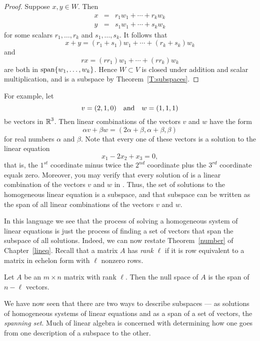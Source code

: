 \documentclass{ximera}
\begin{document}
\begin{proof}  Suppose $x,y\in W$.  Then
\begin{eqnarray*}
x & = & r_1w_1 + \cdots + r_kw_k \\
y & = & s_1w_1 + \cdots + s_kw_k
\end{eqnarray*}
for some scalars $r_1,\ldots,r_k$ and $s_1,\ldots,s_k$.  It
follows that
\[
x+y = (r_1+s_1)w_1 + \cdots + (r_k+s_k)w_k
\]
and
\[
rx = (rr_1)w_1 + \cdots + (rr_k)w_k
\]
are both in ${\rm span}\{w_1,\ldots,w_k\}$. Hence $W\subset V$ is
closed under addition and scalar multiplication, and is a
subspace by Theorem~\ref{T:subspaces}. \end{proof}

For example, let
\begin{equation}  \label{e:vandw}
v=(2,1,0) \quad\mbox{and}\quad w=(1,1,1)
\end{equation}
be vectors in $\mbox{$\Bbb{R}$}^3$. Then linear combinations of the vectors
$v$ and $w$ have the form
\[
\alpha v + \beta w = (2\alpha+\beta, \alpha+\beta, \beta)
\]
for real numbers $\alpha$ and $\beta$.  Note that every one of
these vectors is a solution to the linear equation
\begin{equation} \label{ex1}
x_1 - 2x_2 + x_3 = 0,
\end{equation}
that is, the $1^{st}$ coordinate minus twice the $2^{nd}$ coordinate 
plus the $3^{rd}$ coordinate equals zero.  Moreover, you may verify 
that every solution of  is a linear combination
of the vectors $v$ and $w$ in .  Thus, the set of
solutions to the homogeneous linear equation
 is a
subspace, and that subspace can be written as the span of
all linear combinations of the vectors $v$ and $w$.

In this language we see that the process of solving a
homogeneous system of linear equations is just the process of
finding a set of vectors that span the subspace of all
solutions.  Indeed,
we can now restate Theorem~\ref{number} of Chapter~\ref{lineq}.
Recall that a matrix $A$ has {\em rank\/} $\ell$ if it is row
equivalent to a matrix in echelon form with $\ell$ nonzero rows.

\begin{proposition}  \label{P:n-rank}
Let $A$ be an $m\times n$ matrix with rank $\ell$. Then the
null space of $A$ is the span of $n-\ell$ vectors.
\end{proposition}  

We have now seen that there are two ways to describe subspaces ---
as solutions of homogeneous systems of linear equations and as a
span of a set of vectors, the {\em spanning set}.
Much of linear algebra is concerned
with determining how one goes from one description of a subspace
to the other.
\end{document}

